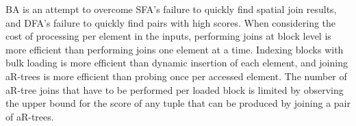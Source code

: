 BA is an attempt to overcome SFA's failure to quickly find spatial join results, and DFA's failure to quickly find pairs with high scores. When considering the cost of processing per element in the inputs, performing joins at block level is more efficient than performing joins one element at a time. Indexing blocks with bulk loading is more efficient than dynamic insertion of each element, and joining aR-trees is more efficient than probing once per accessed element. The number of aR-tree joins that have to be performed per loaded block is limited by observing the upper bound for the score of any tuple that can be produced by joining a pair of aR-trees.
